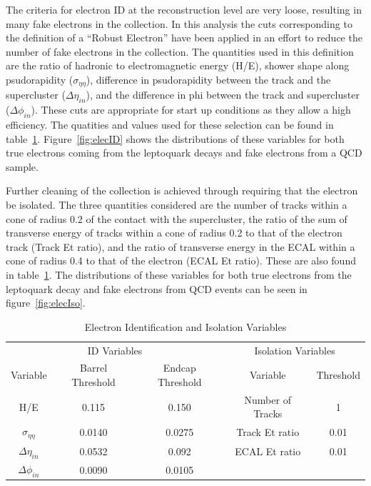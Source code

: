 \documentclass{cmspaper}
\begin{document}
The criteria for electron ID at the reconstruction level are very loose, resulting in many fake electrons in the collection.  In this analysis the cuts corresponding to the definition of a ``Robust Electron'' have been applied in an effort to reduce the number of fake electrons in the collection.  The quantities used in this definition are the ratio of hadronic to electromagnetic energy (H/E), shower shape along psudorapidity ($\sigma_{\eta\eta}$), difference in psudorapidity between the track and the supercluster ($\Delta\eta_{in}$), and the difference in phi between the track and supercluster ($\Delta\phi_{in}$). These cuts are appropriate for start up conditions as they allow a high efficiency.  The quatities and values used for these selection can be found in table~\ref{tab:ElecIdIso}. Figure~\ref{fig:elecID} shows the distributions of these variables for both true electrons coming from the leptoquark decays and fake electrons from a QCD sample.

Further cleaning of the collection is achieved through requiring that the electron be isolated.  The three quantities considered are the number of tracks within a cone of radius 0.2 of the contact with the supercluster, the ratio of the sum of transverse energy of tracks within a cone of radius 0.2 to that of the electron track (Track Et ratio), and the ratio of transverse energy in the ECAL within a cone of radius 0.4 to that of the electron (ECAL Et ratio).  These are also found in table~\ref{tab:ElecIdIso}.  The distributions of these variables for both true electrons from the leptoquark decay and fake electrons from QCD events can be seen in figure~\ref{fig:elecIso}.  

  \begin{table}[htb]
    \caption{Electron Identification and Isolation Variables}
    \label{tab:ElecIdIso}
    \begin{center}
      \begin{tabular}{|ccc|cc|} \hline
                \multicolumn{3}{c|}{ID Variables} & \multicolumn{2}{c|}{Isolation Variables} \\ 
	    Variable & Barrel Threshold & Endcap Threshold & Variable & Threshold \\ \hline
        H/E  & 0.115 & 0.150 & Number of Tracks  & 1 \\ \hline
        $\sigma_{\eta\eta}$  & 0.0140 & 0.0275 & Track Et ratio  & 0.01\\ \hline
        $\Delta\eta_{in}$  & 0.0532 & 0.092 & ECAL Et ratio & 0.01 \\ \hline
        $\Delta\phi_{in}$  & 0.0090 & 0.0105 &  & \\ \hline
      \end{tabular}
    \end{center}
  \end{table}
\end{document}
